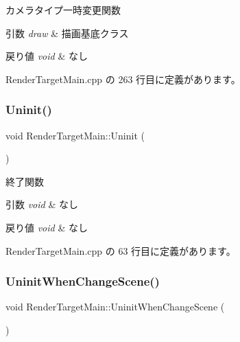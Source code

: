 カメラタイプ一時変更関数 


\begin{DoxyParams}{引数}
{\em draw} & 描画基底クラス \\
\hline
\end{DoxyParams}

\begin{DoxyRetVals}{戻り値}
{\em void} & なし \\
\hline
\end{DoxyRetVals}


 Render\+Target\+Main.\+cpp の 263 行目に定義があります。

\mbox{\label{class_render_target_main_a9b9b05720ddd8918c3c605250e5dd81b}} 
\subsubsection{\texorpdfstring{Uninit()}{Uninit()}}
{\footnotesize\ttfamily void Render\+Target\+Main\+::\+Uninit (\begin{DoxyParamCaption}{ }\end{DoxyParamCaption})}



終了関数 


\begin{DoxyParams}{引数}
{\em void} & なし \\
\hline
\end{DoxyParams}

\begin{DoxyRetVals}{戻り値}
{\em void} & なし \\
\hline
\end{DoxyRetVals}


 Render\+Target\+Main.\+cpp の 63 行目に定義があります。

\mbox{\label{class_render_target_main_aefaa81a0ccf53f1162d230b3b781d892}} 
\subsubsection{\texorpdfstring{Uninit\+When\+Change\+Scene()}{UninitWhenChangeScene()}}
{\footnotesize\ttfamily void Render\+Target\+Main\+::\+Uninit\+When\+Change\+Scene (\begin{DoxyParamCaption}{ }\end{DoxyParamCaption})}



